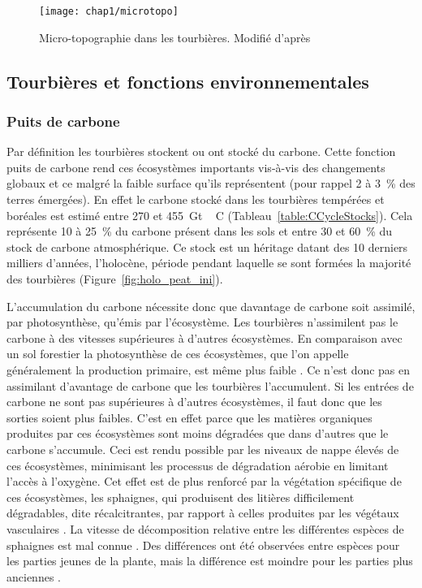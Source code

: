 \begin{figure}[t]
\centering
\texttt{[image: chap1/microtopo]}
\caption{Micro-topographie dans les tourbières. Modifié d'après \citet{rydin2013a}}
\label{fig:microtopo}
\end{figure}

\subsection{Tourbières et fonctions environnementales}

\subsubsection{Puits de carbone}
Par définition les tourbières stockent ou ont stocké du carbone.
Cette fonction puits de carbone rend ces écosystèmes importants vis-à-vis des changements globaux et ce malgré la faible surface qu'ils représentent (pour rappel 2 à \SI{3}{\percent} des terres émergées).
En effet le carbone stocké dans les tourbières tempérées et boréales est estimé entre 270 et \SI{455}{\giga\tonne\,C} (Tableau~\ref{table:CCycleStocks}).
Cela représente 10 à \SI{25}{\percent} du carbone présent dans les sols et entre 30 et \SI{60}{\percent} du stock de carbone atmosphérique.
Ce stock est un héritage datant des 10 derniers milliers d'années, l'holocène, période pendant laquelle se sont formées la majorité des tourbières \citep{yu2010} (Figure~\ref{fig:holo_peat_ini}).

L'accumulation du carbone nécessite donc que davantage de carbone soit assimilé, par photosynthèse, qu'émis par l'écosystème.
Les tourbières n'assimilent pas le carbone à des vitesses supérieures à d'autres écosystèmes.
En comparaison avec un sol forestier la photosynthèse de ces écosystèmes, que l'on appelle généralement la production primaire, est même plus faible \plop.
Ce n'est donc pas en assimilant d'avantage de carbone que les tourbières l'accumulent.
Si les entrées de carbone ne sont pas supérieures à d'autres écosystèmes, il faut donc que les sorties soient plus faibles.
C'est en effet parce que les matières organiques produites par ces écosystèmes sont moins dégradées que dans d'autres que le carbone s'accumule.
Ceci est rendu possible par les niveaux de nappe élevés de ces écosystèmes, minimisant les processus de dégradation aérobie en limitant l'accès à l'oxygène.
Cet effet est de plus renforcé par la végétation spécifique de ces écosystèmes, les sphaignes, qui produisent des litières difficilement dégradables, dite récalcitrantes, par rapport à celles produites par les végétaux vasculaires \citep{hobbie1996,liu2000}.
La vitesse de décomposition relative entre les différentes espèces de sphaignes est mal connue \citep{cornelissen2007}.
Des différences ont été observées entre espèces pour les parties jeunes de la plante, mais la différence est moindre pour les parties plus anciennes \citep{limpens2003}.


